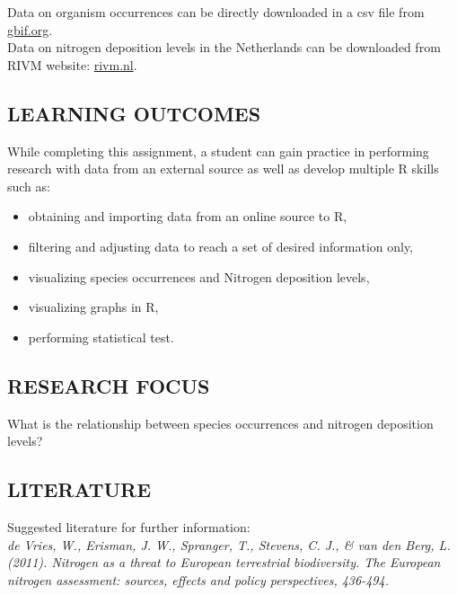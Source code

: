 \documentclass[
]{article}
\providecommand{\tightlist}{%
  \setlength{\itemsep}{0pt}\setlength{\parskip}{0pt}}
\begin{document}
Data on organism occurrences can be directly downloaded in a csv file
from \href{https://www.gbif.org/}{gbif.org}.\\
Data on nitrogen deposition levels in the Netherlands can be downloaded
from RIVM website:
\href{https://www.rivm.nl/gcn-gdn-kaarten/depositiekaarten/cijfers-achter-depositiekaarten/gdn-depositiebestanden-achterliggende-jaren}{rivm.nl}.

\hypertarget{learning-outcomes}{%
\subsection{LEARNING OUTCOMES}\label{learning-outcomes}}

While completing this assignment, a student can gain practice in
performing research with data from an external source as well as develop
multiple R skills such as:

\begin{itemize}
\tightlist
\item
  obtaining and importing data from an online source to R,
\item
  filtering and adjusting data to reach a set of desired information
  only,
\item
  visualizing species occurrences and Nitrogen deposition levels,
\item
  visualizing graphs in R,
\item
  performing statistical test.
\end{itemize}

\hypertarget{research-focus}{%
\subsection{RESEARCH FOCUS}\label{research-focus}}

What is the relationship between species occurrences and nitrogen
deposition levels?

\hypertarget{literature}{%
\subsection{LITERATURE}\label{literature}}

Suggested literature for further information:\\

\emph{de Vries, W., Erisman, J. W., Spranger, T., Stevens, C. J., \& van
den Berg, L. (2011). Nitrogen as a threat to European terrestrial
biodiversity. The European nitrogen assessment: sources, effects and
policy perspectives, 436-494.}
\end{document}
